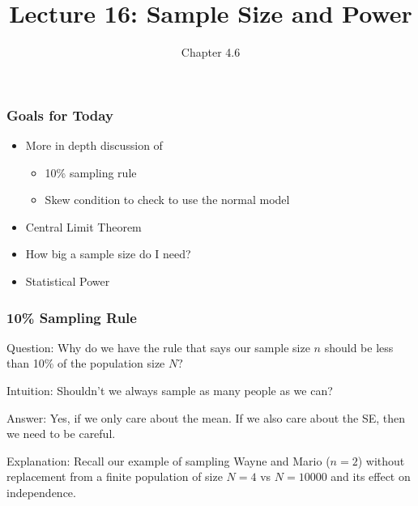 \documentclass[handout]{beamer}
\title{Lecture 16: Sample Size and Power}
\author{Chapter 4.6}
\date{}
\newcommand{\blue}[1]{\textcolor{blue2}{#1}}
\begin{document}
\begin{frame}
\titlepage
\end{frame}


\begin{frame}[fragile]
\frametitle{Goals for Today}

\begin{itemize}
\item More in depth discussion of 
\begin{itemize}
\item 10\% sampling rule
\item Skew condition to check to use the normal model
\end{itemize}
\item Central Limit Theorem
\item How big a sample size do I need?
\item Statistical Power
\end{itemize}

\end{frame}


\begin{frame}[fragile]
\frametitle{10\% Sampling Rule}

\blue{Question}: Why do we have the rule that says our sample size $n$ should be less than 10\% of the population size $N?$

\pause\vspace{0.5cm}

\blue{Intuition}: Shouldn't we always sample as many people as we can?

\pause\vspace{0.5cm}

\blue{Answer}: Yes, if we only care about the mean.  If we also care about the SE, then we need to be careful.  

\pause\vspace{0.5cm}

\blue{Explanation}:  Recall our example of sampling Wayne and Mario ($n=2$) \blue{without replacement} from a \blue{finite} population of size $N=4$ vs $N=10000$ and its effect on independence.

\end{frame}
\end{document}
